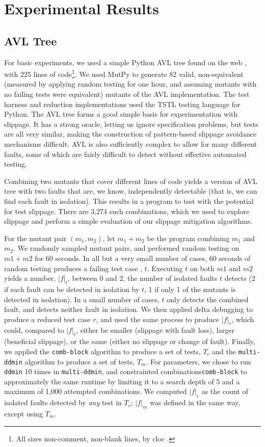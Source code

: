 \section {Experimental Results}

\subsection{AVL Tree}

For basic experiments, we used a simple Python AVL tree found on the
web \cite{avltree}, with 225 lines of code\footnote{All sizes
  non-comment, non-blank lines, by cloc \cite{cloc}.}.  We used MutPy
to generate 82 valid, non-equivalent (measured by applying random
testing for one hour, and assuming mutants with no failing tests were
equivalent) mutants of the AVL implementation.  The test harness and
reduction implementations used the TSTL \cite{tstl,ISSTA15,NFM15}
testing language for Python.  The AVL tree forms a good simple basis
for experimentation with slippage.  It has a strong oracle, letting us
ignore specification problems, but tests are all very similar, making
the construction of pattern-based slippage avoidance mechanisms
difficult.  AVL is also sufficiently complex to allow for many different
faults, some of which are fairly difficult to detect without effective
automated testing.

Combining two mutants that cover different lines of code yields a version
of AVL tree with two faults that are, we know, independently
detectable (that is, we can find each fault in isolation).  This
results in a program to test with the potential for test slippage.
There are 3,274 such combinations, which we used to explore slippage
and perform a simple evaluation of our slippage mitigation algorithms.

For the mutant pair $(m_1,m_2)$, let $m_1+m_2$ be the program
combining $m_1$ and $m_2$.  We randomly sampled mutant pairs, and
performed random testing on $m1+m2$ for 60 seconds. In all but a very
small number of cases, 60 seconds of random testing produces a failing
test case , $t$.  Executing $t$ on both $m1$ and $m2$ yields a number,
$|f|_t$, between 0 and 2, the number of isolated faults $t$ detects (2
if each fault can be detected in isolation by $t$, 1 if only 1 of the
mutants is detected in isolation).  In a small number of cases, $t$
only detects the combined fault, and detects neither fault in
isolation.  We then applied delta debugging to produce a reduced test
case $r$, and used the same process to produce $|f|_r$, which could,
compared to $|f|_t$, either be smaller (slippage with fault loss),
larger (beneficial slippage), or the same (either no slippage or
change of fault).  Finally, we applied the {\tt comb-block} algorithm
to produce a set of tests, $T_c$ and the {\tt multi-ddmin} algorithm
to produce a set of tests, $T_m$.  For parameters, we chose to run
{\tt ddmin} 10 times in {\tt multi-ddmin}, and constrainted
combinations{\tt comb-block} to approximately the same runtime by
limiting it to a search depth of 5 and a maximum of 1,000 attempted
combinations.  We computed $|f|_c$ as the count of isolated faults
detected by \emph{any} test in $T_c$; $|f|_m$ was defined in the same
way, except using $T_m$.

